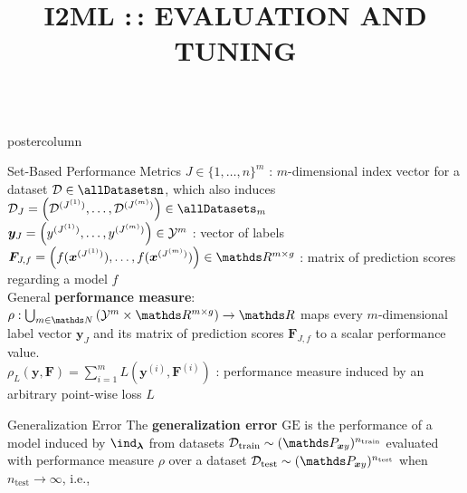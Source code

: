 \documentclass{beamer}
\title{I2ML :\,: EVALUATION AND TUNING} %
\newlength{\columnheight} %
\begin{document}
\begin{frame}[fragile]{}
\vspace{-8ex}
\begin{columns}
	\begin{column}{.31\textwidth}
		\begin{beamercolorbox}[center]{postercolumn}
			\begin{minipage}{.98\textwidth}
				\parbox[t][\columnheight]{\textwidth}{
\begin{myblock}{Set-Based Performance Metrics}
$J \in \{1,\dots,n\}^m$ : $m$-dimensional index vector for a dataset $\D \in 
\allDatasetsn$, which also induces 
$\D_J = \left(\D^{(J^{(1)})},\dots,\D^{(J^{(m)})}\right) \in \allDatasets_m$\\


$\boldsymbol{y}_J = \left(y^{(J^{(1)})},\dots,y^{(J^{(m)})}\right) \in \mathcal{Y}^m$ :
vector of labels\\

$\boldsymbol{F}_{J,f} = \left(f(\xv^{(J^{(1)})}),\dots, f(\xv^{(J^{(m)})})\right) 
\in \R^{m\times g}$ : matrix of prediction scores regarding a model $f$\\

General \textbf{performance measure}: $\rho: \bigcup_{m\in\N}\left(\Yspace^m\times\R^{m\times g}\right)  \rightarrow \R$ maps every $m$-dimensional label vector $\boldsymbol{y}_J$ and its matrix of prediction scores $\boldsymbol{F}_{J,f}$ to a scalar performance value.\\

$\rho_L (\boldsymbol{y}, \boldsymbol{F}) = \sum_{i=1}^m L(\boldsymbol{y}^{(i)}, \boldsymbol{F}^{(i)})$ : performance measure induced by an arbitrary point-wise loss $L$

\end{myblock}
\begin{myblock}{Generalization Error}
The \textbf{generalization error} $\mathrm{GE}$ is the performance of a model induced by $\ind_{\boldsymbol{\lambda}}$ from datasets $\Dtrain \sim (\P_{\xv y})^{n_{\mathrm{train}}}$ evaluated with performance measure $\rho$ over a dataset $\Dtest \sim (\P_{\xv y})^{n_{\mathrm{test}}}$ when $n_{\mathrm{test}}\rightarrow\infty$, i.e.,\\


\end{myblock}}
\end{minipage}
\end{beamercolorbox}
\end{column}
\end{columns}
\end{frame}
\end{document}
